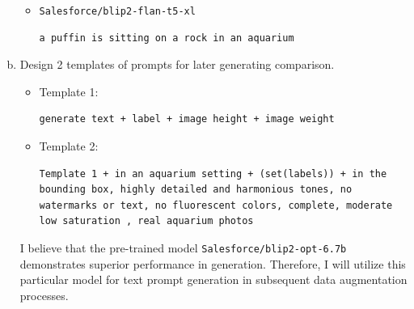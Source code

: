 \documentclass[10pt,a4paper]{article}
\begin{document}
\begin{enumerate}[(a)]
\begin{itemize}
\item \verb|Salesforce/blip2-flan-t5-xl|
\begin{lstlisting}[frame=single]
a puffin is sitting on a rock in an aquarium
\end{lstlisting}
\end{itemize}

\item Design 2 templates of prompts for later generating comparison.
\begin{itemize}
\item Template 1: 
\begin{lstlisting}[frame=single]
generate text + label + image height + image weight
\end{lstlisting}

\item Template 2: 
\begin{lstlisting}[frame=single]
Template 1 + in an aquarium setting + (set(labels)) + in the bounding box, highly detailed and harmonious tones, no watermarks or text, no fluorescent colors, complete, moderate low saturation , real aquarium photos
\end{lstlisting}
\end{itemize}


I believe that the pre-trained model \verb|Salesforce/blip2-opt-6.7b| demonstrates superior performance in generation. Therefore, I will utilize this particular model for text prompt generation in subsequent data augmentation processes.

\end{enumerate}
\end{document}
